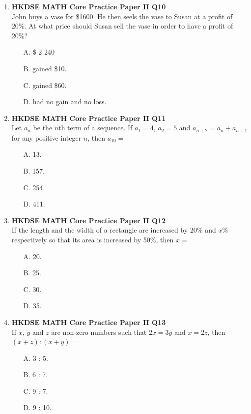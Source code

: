 \documentclass[12pt]{article}
\begin{document}
\begin{enumerate}
	\item \textbf{HKDSE MATH Core Practice Paper II Q10}\\
	John buys a vase for \$1600. He then seels the vase to Susan at a profit of 20\%. At what price should Susan sell the vase in order to have a profit of 20\%?
	\begin{enumerate}
		\item[A.] \$ 2 240
		\item[B.] gained \$10.
		\item[C.] gained \$60.
		\item[D.] had no gain and no loss.
	\end{enumerate}

	\item \textbf{HKDSE MATH Core Practice Paper II Q11}\\
	Let $a_n$ be the $n$th term of a sequence. If $a_1 = 4$, $a_2 = 5$ and $a_{n + 2} = a_n + a_{n + 1}$ for any positive integer $n$, then $a_{10} = $
	\begin{enumerate}
		\item[A.] 13.
		\item[B.] 157.
		\item[C.] 254.
		\item[D.] 411.
	\end{enumerate}

	\item \textbf{HKDSE MATH Core Practice Paper II Q12}\\
	If the length and the width of a rectangle are increased by 20\% and $x\%$ respectively so that its area is increased by 50\%, then $x = $
	\begin{enumerate}
		\item[A.] 20.
		\item[B.] 25.
		\item[C.] 30.
		\item[D.] 35.
	\end{enumerate}

	\item \textbf{HKDSE MATH Core Practice Paper II Q13}\\
	If $x$, $y$ and $z$ are non-zero numbers such that $2x = 3y$ and $x = 2z$, then $(x + z) : (x + y) = $
	\begin{enumerate}
		\item[A.] 3 : 5.
		\item[B.] 6 : 7.
		\item[C.] 9 : 7.
		\item[D.] 9 : 10.
	\end{enumerate}


\end{enumerate}
\end{document}
